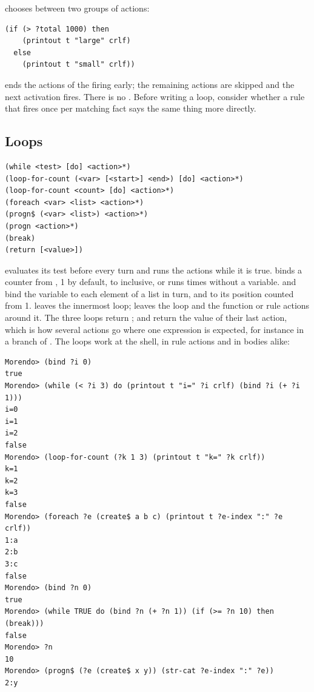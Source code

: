  chooses between two groups of actions:

\begin{lstlisting}
(if (> ?total 1000) then
    (printout t "large" crlf)
  else
    (printout t "small" crlf))
\end{lstlisting}

 ends the actions of the firing early; the remaining
actions are skipped and the next activation fires. There is no
. Before writing a loop, consider whether a rule that fires
once per matching fact says the same thing more directly.

\subsection{Loops}
\label{sec:loops}

\begin{lstlisting}
(while <test> [do] <action>*)
(loop-for-count (<var> [<start>] <end>) [do] <action>*)
(loop-for-count <count> [do] <action>*)
(foreach <var> <list> <action>*)
(progn$ (<var> <list>) <action>*)
(progn <action>*)
(break)
(return [<value>])
\end{lstlisting}

 evaluates its test before every turn and runs the actions
while it is true.  binds a counter from ,
1 by default, to  inclusive, or runs  times without
a variable.  and  bind the variable to each
element of a list in turn, and  to its position counted
from 1.  leaves the innermost loop;  leaves the
loop and the function or rule actions around it. The three loops return
;  and  return the value of their last
action, which is how several actions go where one expression is
expected, for instance in a branch of . The loops work at the
shell, in rule actions and in  bodies alike:

\begin{lstlisting}[style=shell]
Morendo> (bind ?i 0)
true
Morendo> (while (< ?i 3) do (printout t "i=" ?i crlf) (bind ?i (+ ?i 1)))
i=0
i=1
i=2
false
Morendo> (loop-for-count (?k 1 3) (printout t "k=" ?k crlf))
k=1
k=2
k=3
false
Morendo> (foreach ?e (create$ a b c) (printout t ?e-index ":" ?e crlf))
1:a
2:b
3:c
false
Morendo> (bind ?n 0)
true
Morendo> (while TRUE do (bind ?n (+ ?n 1)) (if (>= ?n 10) then (break)))
false
Morendo> ?n
10
Morendo> (progn$ (?e (create$ x y)) (str-cat ?e-index ":" ?e))
2:y
\end{lstlisting}


